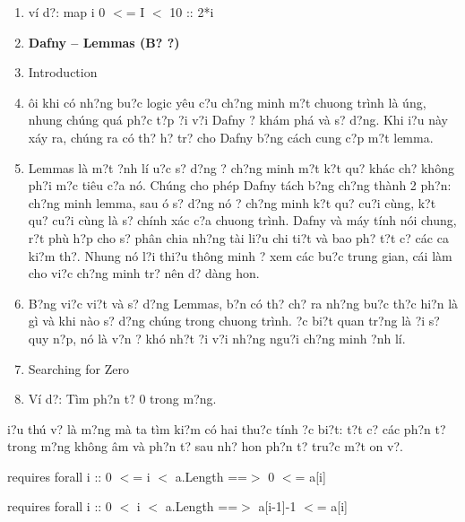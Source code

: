 \documentclass{article} %
\begin{document}
\begin{enumerate}
\item  v\'{i} d?: map i {\textbar} 0 $<$= I $<$ 10 :: 2*i

\item  \textbf{Dafny -- Lemmas (B? {\dj}?)}

\item \textbf{ }Introduction

\item  {\DJ}\^{o}i khi c\'{o} nh?ng bu?c logic y\^{e}u c?u ch?ng minh m?t chuong tr\`{i}nh l\`{a} {\dj}\'{u}ng, nhung ch\'{u}ng qu\'{a} ph?c t?p {\dj}?i v?i Dafny {\dj}? kh\'{a}m ph\'{a} v\`{a} s? d?ng. Khi {\dj}i?u n\`{a}y x\'{a}y ra, ch\'{u}ng ra c\'{o} th? h? tr? cho Dafny b?ng c\'{a}ch cung c?p m?t lemma.

\item  Lemmas l\`{a} m?t {\dj}?nh l\'{i} {\dj}u?c s? d?ng {\dj}? ch?ng minh m?t k?t qu? kh\'{a}c ch? kh\^{o}ng ph?i m?c ti\^{e}u c?a n\'{o}. Ch\'{u}ng cho ph\'{e}p Dafny t\'{a}ch b?ng ch?ng th\`{a}nh 2 ph?n: ch?ng minh lemma, sau {\dj}\'{o} s? d?ng n\'{o} {\dj}? ch?ng minh k?t qu? cu?i c\`{u}ng, k?t qu? cu?i c\`{u}ng l\`{a} s? ch\'{i}nh x\'{a}c c?a chuong tr\`{i}nh. Dafny v\`{a} m\'{a}y t\'{i}nh n\'{o}i chung, r?t ph\`{u} h?p cho s? ph\^{a}n chia nh?ng t\`{a}i li?u chi ti?t v\`{a} bao ph? t?t c? c\'{a}c ca ki?m th?. Nhung n\'{o} l?i thi?u th\^{o}ng minh {\dj}? xem c\'{a}c bu?c trung gian, c\'{a}i l\`{a}m cho vi?c ch?ng minh tr? n\^{e}n d? d\`{a}ng hon.

\item  B?ng vi?c vi?t v\`{a} s? d?ng Lemmas, b?n c\'{o} th? ch? ra nh?ng bu?c th?c hi?n l\`{a} g\`{i} v\`{a} khi n\`{a}o s? d?ng ch\'{u}ng trong chuong tr\`{i}nh. {\DJ}?c bi?t quan tr?ng l\`{a} {\dj}?i s? quy n?p, n\'{o} l\`{a} v?n {\dj}? kh\'{o} nh?t {\dj}?i v?i nh?ng ngu?i ch?ng minh {\dj}?nh l\'{i}.

\item  Searching for Zero

\item  V\'{i} d?: T\`{i}m ph?n t? 0 trong m?ng.
\end{enumerate}

{\DJ}i?u th\'{u} v? l\`{a} m?ng m\`{a} ta t\`{i}m ki?m c\'{o} hai thu?c t\'{i}nh {\dj}?c bi?t: t?t c? c\'{a}c ph?n t? trong m?ng kh\^{o}ng \^{a}m v\`{a} ph?n t? sau nh? hon ph?n t? tru?c m?t {\dj}on v?.

\noindent requires forall i :: 0 $<$= i $<$ a.Length ==$>$ 0 $<$= a[i]

\noindent requires forall i :: 0 $<$ i $<$ a.Length ==$>$ a[i-1]-1 $<$= a[i]
\end{document}
